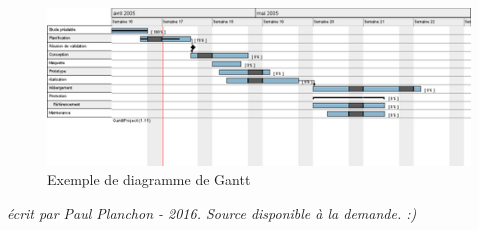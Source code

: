 \documentclass{article}
\begin{document}
\begin{figure}[h]
\centering
\includegraphics[scale=0.5]{img/gantt.png}
\caption{Exemple de diagramme de Gantt}
\label{fig:story}
\end{figure}

\bigbreak

\bigbreak
\bigbreak
\bigbreak
\bigbreak
\bigbreak

\bigbreak
\bigbreak
\bigbreak
\bigbreak
\bigbreak
\bigbreak
\bigbreak
\bigbreak
\bigbreak
\bigbreak

\textit{écrit par Paul Planchon - 2016. Source disponible à la demande. :)}
\end{document}
